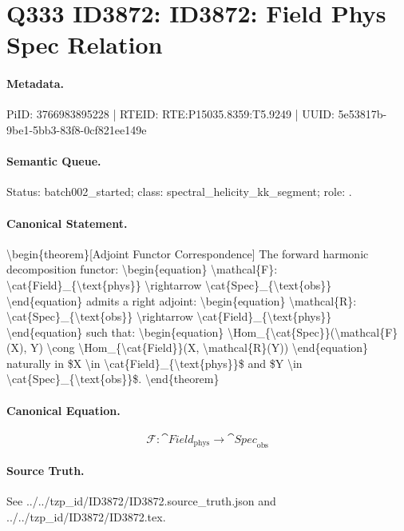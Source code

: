 \section*{Q333 ID3872: ID3872: Field Phys Spec Relation}
\paragraph{Metadata.}
PiID: 3766983895228 | RTEID: RTE:P15035.8359:T5.9249 | UUID: 5e53817b-9be1-5bb3-83f8-0cf821ee149e

\paragraph{Semantic Queue.}
Status: batch002\_started; class: spectral\_helicity\_kk\_segment; role: .

\paragraph{Canonical Statement.}
\textbackslash{}begin\{theorem\}[Adjoint Functor Correspondence] The forward harmonic decomposition functor: \textbackslash{}begin\{equation\} \textbackslash{}mathcal\{F\}: \textbackslash{}cat\{Field\}\_\{\textbackslash{}text\{phys\}\} \textbackslash{}rightarrow \textbackslash{}cat\{Spec\}\_\{\textbackslash{}text\{obs\}\} \textbackslash{}end\{equation\} admits a right adjoint: \textbackslash{}begin\{equation\} \textbackslash{}mathcal\{R\}: \textbackslash{}cat\{Spec\}\_\{\textbackslash{}text\{obs\}\} \textbackslash{}rightarrow \textbackslash{}cat\{Field\}\_\{\textbackslash{}text\{phys\}\} \textbackslash{}end\{equation\} such that: \textbackslash{}begin\{equation\} \textbackslash{}Hom\_\{\textbackslash{}cat\{Spec\}\}(\textbackslash{}mathcal\{F\}(X), Y) \textbackslash{}cong \textbackslash{}Hom\_\{\textbackslash{}cat\{Field\}\}(X, \textbackslash{}mathcal\{R\}(Y)) \textbackslash{}end\{equation\} naturally in \$X \textbackslash{}in \textbackslash{}cat\{Field\}\_\{\textbackslash{}text\{phys\}\}\$ and \$Y \textbackslash{}in \textbackslash{}cat\{Spec\}\_\{\textbackslash{}text\{obs\}\}\$. \textbackslash{}end\{theorem\}

\paragraph{Canonical Equation.}
\[
\begin{equation} \mathcal{F}: \cat{Field}_{\text{phys}} \rightarrow \cat{Spec}_{\text{obs}} \end{equation}
\]

\paragraph{Source Truth.}
See ../../tzp\_id/ID3872/ID3872.source\_truth.json and ../../tzp\_id/ID3872/ID3872.tex.

